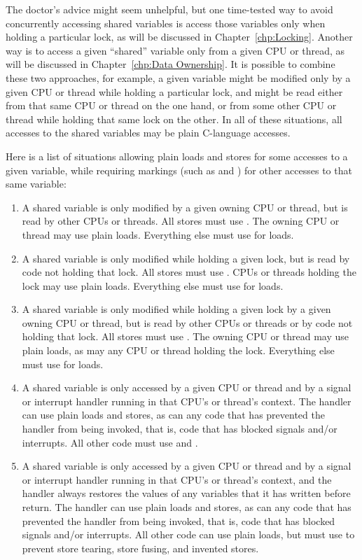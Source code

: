 The doctor's advice might seem unhelpful, but
one time-tested way to avoid concurrently accessing shared variables
is access those variables only when holding a particular lock, as will
be discussed in Chapter~\ref{chp:Locking}.
Another way is to access a given ``shared'' variable only from a given
CPU or thread, as will be discussed in
Chapter~\ref{chp:Data Ownership}.
It is possible to combine these two approaches, for example, a given
variable might be modified only by a given CPU or thread while holding a
particular lock, and might be read either from that same CPU or thread
on the one hand, or from some other CPU or thread while holding that
same lock on the other.
In all of these situations, all accesses to the shared variables may
be plain C-language accesses.

Here is a list of situations
allowing plain loads and stores for some accesses to a given variable,
while requiring markings (such as  and )
for other accesses to that same variable:

\begin{enumerate}
\item	A shared variable is only modified by a given owning CPU or
	thread, but is read by other CPUs or threads.
	All stores must use .
	The owning CPU or thread may use plain loads.
	Everything else must use  for loads.
\item	A shared variable is only modified while holding a given
	lock, but is read by code not holding that lock.
	All stores must use .
	CPUs or threads holding the lock may use plain loads.
	Everything else must use  for loads.
\item	A shared variable is only modified while holding a given
	lock by a given owning CPU or thread, but is read by other
	CPUs or threads or by code not holding that lock.
	All stores must use .
	The owning CPU or thread may use plain loads, as may any
	CPU or thread holding the lock.
	Everything else must use  for loads.
\item	A shared variable is only accessed by a given CPU or thread
	and by a signal or interrupt handler running in that CPU's
	or thread's context.
	The handler can use plain loads and stores, as can any code
	that has prevented the handler from being invoked, that is,
	code that has blocked signals and/or interrupts.
	All other code must use  and .
\item	A shared variable is only accessed by a given CPU or thread
	and by a signal or interrupt handler running in that CPU's
	or thread's context, and the handler always restores the values of any
	variables that it has written before return.
	The handler can use plain loads and stores, as can any code
	that has prevented the handler from being invoked, that is,
	code that has blocked signals and/or interrupts.
	All other code can use plain loads, but must use 
	to prevent store tearing, store fusing, and invented stores.
\end{enumerate}

